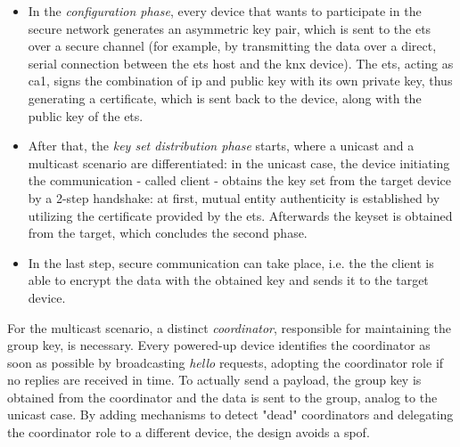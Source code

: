 \begin{itemize}
 \item In the \textit{configuration phase}, every device that wants to participate in the secure network
generates an asymmetric key pair, which is sent to the \gls{ets} over a secure channel (for example, by transmitting the data over a direct, serial connection
between the \gls{ets} host and the \gls{knx} device).
The \gls{ets}, acting as \gls{ca1}, signs the combination of \gls{ip} and public key with its own private key, thus generating a certificate, which is sent back to the device, along
with the public key of the \gls{ets}. 
 \item After that, the \textit{key set distribution phase} starts, where a unicast and a multicast scenario are differentiated:
in the unicast case, the device initiating the communication - called client - obtains the key set from the target device by a 2-step handshake: at first, mutual entity 
authenticity is established by utilizing the certificate provided by the \gls{ets}. Afterwards the keyset is obtained from the target, which concludes the second
phase.
\item In the last step, secure communication can take place, i.e. the the client is able to
encrypt the data with the obtained key and sends it to the target device.
\end{itemize}
For the multicast scenario, a distinct \textit{coordinator}, responsible for maintaining the group key, is necessary. Every powered-up device
identifies the coordinator as soon as possible by broadcasting \textit{hello} requests, adopting the coordinator role if no replies are received in time.
To actually send a payload, the group key is obtained from the coordinator and the data is sent to the group, analog to the unicast case.
By adding mechanisms to detect "dead" coordinators and delegating the coordinator role to a different device, the design avoids a \gls{spof}.

